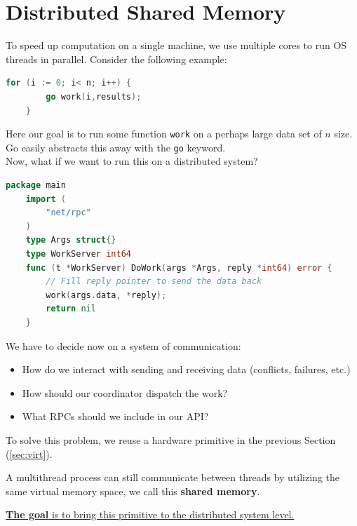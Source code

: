 \newpage
\section{Distributed Shared Memory}
\label{sec:shared}


\noindent
To speed up computation on a single machine, we use multiple cores to 
run OS threads in parallel. Consider the following example:

\begin{lstlisting}[language=Go]
    for (i := 0; i< n; i++) {
        go work(i,results);
    }  
\end{lstlisting}

\noindent
Here our goal is to run some function \texttt{work} on a perhaps large 
data set of $n$ size. Go easily abstracts this away with the \texttt{go} keyword.\\

\noindent
Now, what if we want to run this on a distributed system?

\begin{lstlisting}[language=Go]
    package main
    import (
        "net/rpc"
    )
    type Args struct{}
    type WorkServer int64
    func (t *WorkServer) DoWork(args *Args, reply *int64) error {
        // Fill reply pointer to send the data back
        work(args.data, *reply);
        return nil
    }
\end{lstlisting}

\noindent
We have to decide now on a system of communication:
\begin{itemize}
    \item How do we interact with sending and receiving data (conflicts, failures, etc.)
    \item How should our coordinator dispatch the work?
    \item What RPCs should we include in our API?
\end{itemize}

\noindent
To solve this problem, we reuse a hardware primitive in the previous Section (\ref{sec:virt}).
\begin{theo}

    A multithread process can still communicate between threads by utilizing the same virtual memory space, we call this \textbf{shared memory}.
\end{theo}
\noindent
\underline{\textbf{The goal} is to bring this primitive to the distributed system level.}

\newpage 

